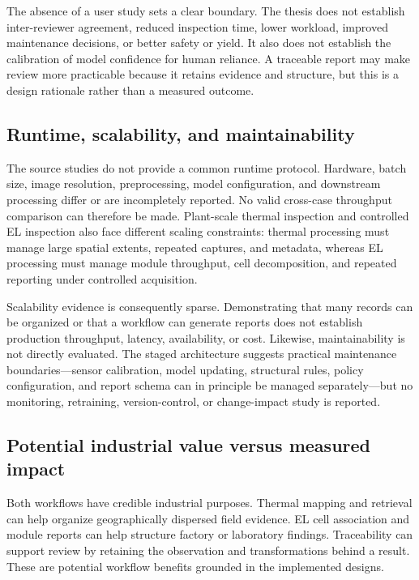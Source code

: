 \documentclass[12pt,a4paper]{report}
\begin{document}
The absence of a user study sets a clear boundary. The thesis does not establish inter-reviewer agreement, reduced inspection time, lower workload, improved maintenance decisions, or better safety or yield. It also does not establish the calibration of model confidence for human reliance. A traceable report may make review more practicable because it retains evidence and structure, but this is a design rationale rather than a measured outcome.

\subsection{Runtime, scalability, and maintainability}

The source studies do not provide a common runtime protocol. Hardware, batch size, image resolution, preprocessing, model configuration, and downstream processing differ or are incompletely reported. No valid cross-case throughput comparison can therefore be made. Plant-scale thermal inspection and controlled EL inspection also face different scaling constraints: thermal processing must manage large spatial extents, repeated captures, and metadata, whereas EL processing must manage module throughput, cell decomposition, and repeated reporting under controlled acquisition.

Scalability evidence is consequently sparse. Demonstrating that many records can be organized or that a workflow can generate reports does not establish production throughput, latency, availability, or cost. Likewise, maintainability is not directly evaluated. The staged architecture suggests practical maintenance boundaries---sensor calibration, model updating, structural rules, policy configuration, and report schema can in principle be managed separately---but no monitoring, retraining, version-control, or change-impact study is reported.

\subsection{Potential industrial value versus measured impact}

Both workflows have credible industrial purposes. Thermal mapping and retrieval can help organize geographically dispersed field evidence. EL cell association and module reports can help structure factory or laboratory findings. Traceability can support review by retaining the observation and transformations behind a result. These are potential workflow benefits grounded in the implemented designs.
\end{document}
